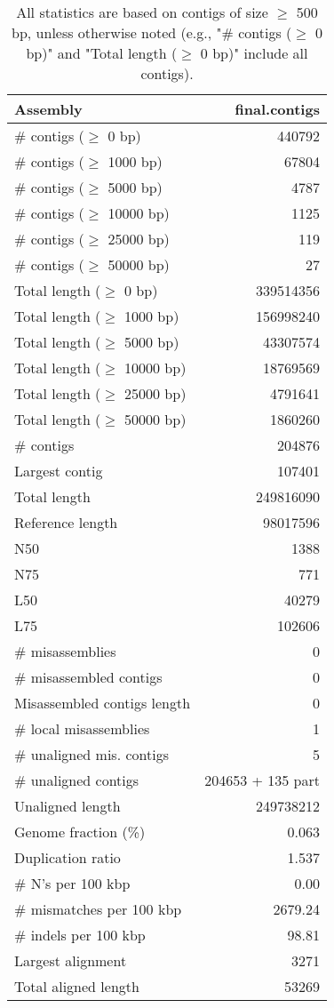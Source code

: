 \documentclass[12pt,a4paper]{article}
\begin{document}
\begin{table}[ht]
\begin{center}
\caption{All statistics are based on contigs of size $\geq$ 500 bp, unless otherwise noted (e.g., "\# contigs ($\geq$ 0 bp)" and "Total length ($\geq$ 0 bp)" include all contigs).}
\begin{tabular}{|l*{1}{|r}|}
\hline
Assembly & final.contigs \\ \hline
\# contigs ($\geq$ 0 bp) & 440792 \\ \hline
\# contigs ($\geq$ 1000 bp) & 67804 \\ \hline
\# contigs ($\geq$ 5000 bp) & 4787 \\ \hline
\# contigs ($\geq$ 10000 bp) & 1125 \\ \hline
\# contigs ($\geq$ 25000 bp) & 119 \\ \hline
\# contigs ($\geq$ 50000 bp) & 27 \\ \hline
Total length ($\geq$ 0 bp) & 339514356 \\ \hline
Total length ($\geq$ 1000 bp) & 156998240 \\ \hline
Total length ($\geq$ 5000 bp) & 43307574 \\ \hline
Total length ($\geq$ 10000 bp) & 18769569 \\ \hline
Total length ($\geq$ 25000 bp) & 4791641 \\ \hline
Total length ($\geq$ 50000 bp) & 1860260 \\ \hline
\# contigs & 204876 \\ \hline
Largest contig & 107401 \\ \hline
Total length & 249816090 \\ \hline
Reference length & 98017596 \\ \hline
N50 & 1388 \\ \hline
N75 & 771 \\ \hline
L50 & 40279 \\ \hline
L75 & 102606 \\ \hline
\# misassemblies & 0 \\ \hline
\# misassembled contigs & 0 \\ \hline
Misassembled contigs length & 0 \\ \hline
\# local misassemblies & 1 \\ \hline
\# unaligned mis. contigs & 5 \\ \hline
\# unaligned contigs & 204653 + 135 part \\ \hline
Unaligned length & 249738212 \\ \hline
Genome fraction (\%) & 0.063 \\ \hline
Duplication ratio & 1.537 \\ \hline
\# N's per 100 kbp & 0.00 \\ \hline
\# mismatches per 100 kbp & 2679.24 \\ \hline
\# indels per 100 kbp & 98.81 \\ \hline
Largest alignment & 3271 \\ \hline
Total aligned length & 53269 \\ \hline
\end{tabular}
\end{center}
\end{table}
\end{document}
